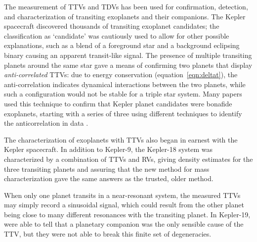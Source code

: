 \documentclass[graybox,natbib,nosecnum]{svmult}
\begin{document}
The measurement of TTVs and TDVs has been used for confirmation, detection, and characterization of
transiting exoplanets and their companions.  The Kepler spacecraft discovered thousands of transiting
exoplanet candidates;  the classification as `candidate' was cautiously used to allow for other
possible explanations, such as a blend of a foreground star and a background eclipsing binary causing
an apparent transit-like signal.  The presence of multiple transiting planets around the same star
gave a means of confirming two planets that display {\em anti-correlated} TTVs: due to energy conservation (equation~\ref{eqn:deltat}), the anti-correlation indicates dynamical interactions between the
two planets, while such a configuration would not be stable for a triple star system.  Many papers 
used this technique to confirm that Kepler planet candidates were bonafide exoplanets, starting with a series of three using different techniques to identify the anticorrelation in data \citet{2011ApJS..197....2F, 2012ApJ...750..113F, 2012ApJ...750..114F}.

The characterization of exoplanets with TTVs also began in earnest with the Kepler spacecraft.
In addition to Kepler-9, the Kepler-18 system was characterized by a combination of TTVs and
RVs, giving density estimates for the three transiting planets \citep{2011ApJS..197....7C} and assuring that the new method for mass characterization gave the same answers as the trusted, older method.


When only one planet transits in a near-resonant system, the measured TTVs may simply record a sinusoidal signal, which could result from the other planet being close to many different resonances with the transiting planet.  In Kepler-19, \cite{2011ApJ...743..200B} were able to tell that a planetary companion was the only sensible cause of the TTV, but they were not able to break this finite set of degeneracies. 
\end{document}
